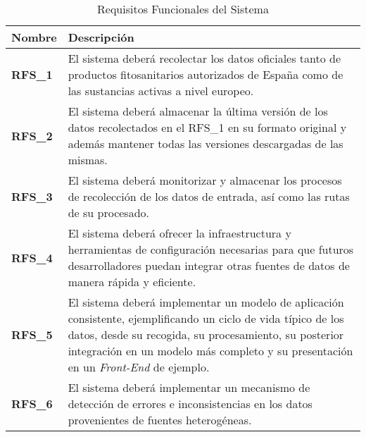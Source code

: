 \newpage

\begin{table}[!h]
\centering
\bgroup
\def\arraystretch{1.3}
\begin{tabular}{l p{13cm}}
\toprule
\textbf{Nombre} & \textbf{Descripción} \\
 \midrule
\textbf{RFS\_1} & 
El sistema deberá recolectar los datos oficiales tanto de productos fitosanitarios autorizados de España como de las sustancias activas a nivel europeo.
 \\
\textbf{RFS\_2} & 
El sistema deberá almacenar la última versión de los datos recolectados en el RFS\_1 en su formato original y además mantener todas las versiones descargadas de las mismas. 
 \\
\textbf{RFS\_3} & 
El sistema deberá monitorizar y almacenar los procesos de recolección de los datos de entrada, así como las rutas de su procesado. 
 \\
\textbf{RFS\_4} & 
El sistema deberá ofrecer la infraestructura y herramientas de configuración necesarias para que futuros desarrolladores puedan integrar otras fuentes de datos de manera rápida y eficiente. 
 \\
\textbf{RFS\_5} & 
El sistema deberá implementar un modelo de aplicación consistente, ejemplificando un ciclo de vida típico de los datos, desde su recogida, su procesamiento, su posterior integración en un modelo más completo y su presentación en un \textit{Front-End} de ejemplo.
 \\
\textbf{RFS\_6} & 
El sistema deberá implementar un mecanismo de detección de errores e inconsistencias en los datos provenientes de fuentes heterogéneas.
 \\
\bottomrule
\end{tabular}
\egroup
\caption{Requisitos Funcionales del Sistema}
\label{tab:req_func_sist}
\end{table}

